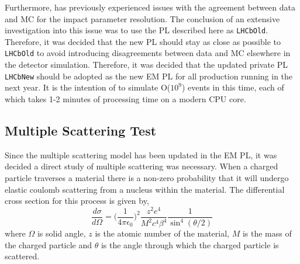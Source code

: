 Furthermore, \lhcb has previously experienced issues with the agreement between data and MC for the impact parameter resolution.  The conclusion of an extensive investigation into this issue was to use the PL described here as \texttt{LHCbOld}.  Therefore, it was decided that the new PL should stay as close as possible to \texttt{LHCbOld} to avoid introducing disagreements between data and MC elsewhere in the detector simulation.  Therefore, it was decided that the updated \lhcb private PL \texttt{LHCbNew} should be adopted as the new EM PL for all production running in the next year.  It is the intention of \lhcb to simulate O($10^9$) events in this time, each of which takes 1-2 minutes of processing time on a modern CPU core.





\clearpage

\subsection{Multiple Scattering Test}
\label{sec:Multiple Scattering Test}
Since the multiple scattering model has been updated in the EM PL, it was decided a direct study of multiple scattering was necessary.  When a charged particle traverses a material there is a non-zero probability that it will undergo elastic coulomb scattering from a nucleus within the material.  The differential cross section for this process is given by,
\begin{equation}
  \label{eq:Rutherford}
  \frac{d\sigma}{d\Omega}=\big(\frac{1}{4\pi\epsilon_0}\big)^2\frac{z^2e^4}{M^2c^4\beta^4}\frac{1}{\sin^4(\theta/2)}
  \end{equation}
where $\Omega$ is solid angle, $z$ is the atomic number of the material, $M$ is the mass of the charged particle and $\theta$ is the angle through which the charged particle is scattered\cite{eisberg1974quantum}.

